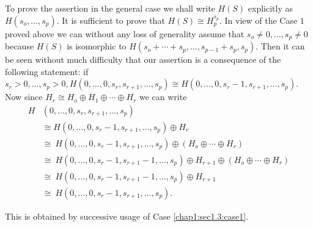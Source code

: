 \begin{case}\label{chap1:sec1.3:case2}%
  To prove the assertion in the general case we shall write $H(S)$
  explicitly as $H(s_o,  \ldots,  s_p)$. It is sufficient to prove
  that $H(S) \cong H^{s_p}_p$. In view of the Case $1$ proved above we
  can without any loss of generality assume that $s_o \neq 0,  \ldots,
  s_p \neq 0$ because $H(S)$ is isomorphic to $H(s_o + \cdots + s_p,
  \ldots,  s_{p-1} + s_p,  s_p)$. Then it can be seen without much
  difficulty that our assertion is a consequence of the following
  statement: if $s_r > 0,  \ldots,  s_p > 0,  H(0,  \ldots,  0,  s_r,
  s_{r+1},  \ldots,  s_p) \cong H(0,  \ldots,  0,  s_r - 1,  s_{r+1},
  \ldots,  s_p)$. Now since $H_r \cong H_o \oplus H_1 \oplus \cdots
  \oplus H_r$  we can write 
\begin{align*}
  H & (0,  \ldots,  0,  s_r,  s_{r+1},  \ldots,  s_p)\\ 
  &\cong H(0,  \ldots,
  0,  s_r -1,  s_{r+1},  \ldots,  s_p) \oplus H_r \\
    & \cong ~ H(0, \ldots, 0, s_r -1,  s_{r+1},  \ldots,  s_p) \oplus
    (H_o \oplus \cdots \oplus H_r)\\ 
    & \cong ~ H(0,  \ldots,  0,  s_r -1,  s_{r+1}-1,  \ldots,  s_p)
    \oplus H_{r+1} \oplus (H_o \oplus \cdots \oplus H_r)\\ 
    & \cong ~ H(0,  \ldots,  0,  s_r -1,  s_{r+1}-1,  \ldots,  s_p)
    \oplus H_{r+1}\\ 
    & \cong ~ H(0,  \ldots,  0,  s_r -1,  s_{r+1},  \ldots,  s_p).
  \end{align*}
\end{case}\pageoriginale

This is obtained by successive usage of Case \ref{chap1:sec1.3:case1}.

\section{}\label{chap1:sec1.4}%

